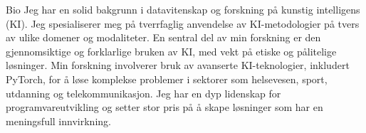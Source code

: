 \begin{rubric}{Bio}
\entry*[]
Jeg har en solid bakgrunn i datavitenskap og forskning på kunstig intelligens (KI). Jeg spesialiserer meg på tverrfaglig anvendelse av KI-metodologier på tvers av ulike domener og modaliteter. En sentral del av min forskning er den gjennomsiktige og forklarlige bruken av KI, med vekt på etiske og pålitelige løsninger. Min forskning involverer bruk av avanserte KI-teknologier, inkludert PyTorch, for å løse komplekse problemer i sektorer som helsevesen, sport, utdanning og telekommunikasjon. Jeg har en dyp lidenskap for programvareutvikling og setter stor pris på å skape løsninger som har en meningsfull innvirkning.
\end{rubric}
